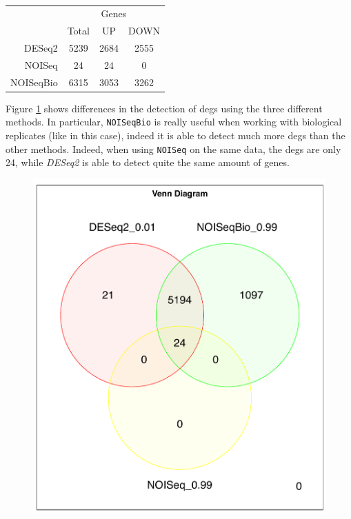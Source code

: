 \begin{table}[H]
\centering
\begin{tabular}{r c c c}
\multicolumn{1}{r}{} & \multicolumn{3}{c}{Genes} \\
\cline{2-4}
\multicolumn{1}{r}{} & Total & UP & DOWN \\
\cline{2-4}
DESeq2 & 5239 & 2684 & 2555 \\
NOISeq & 24 & 24 & 0 \\
NOISeqBio & 6315 & 3053 & 3262 \\
\end{tabular}
\caption[\gls{tic} Single Time Points DE methods results]{}
\label{tab:ticorserderesultstp}
\end{table}

Figure \ref{fig:ticorsertpvenn} shows differences in the detection of \glspl{deg} using the three different methods.
In particular, \lstinline!NOISeqBio! is really useful when working with biological replicates (like in this case), indeed it is able to detect much more \glspl{deg} than the other methods. 
Indeed, when using \lstinline!NOISeq! on the same data, the \glspl{deg} are only 24, while \textit{DESeq2} is able to detect quite the same amount of genes.

\begin{figure}[H]
\includegraphics[width=\textwidth,keepaspectratio]{img/ticorser/de/singleTP/venn.pdf}
\caption[ticorser venn diagram single time point]{}
\label{fig:ticorsertpvenn}
\centering
\end{figure}

